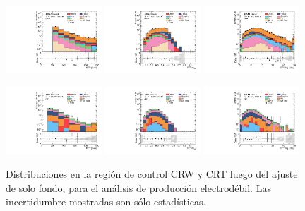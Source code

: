 \begin{figure}

\centering

    \includegraphics[width=0.32\textwidth]{images/analysis_EWK/v192_1_nosyst/can_CRW_met_et_afterFit.pdf}
    \includegraphics[width=0.32\textwidth]{images/analysis_EWK/v192_1_nosyst/can_CRW_met_etmeff_afterFit.pdf}
    \includegraphics[width=0.32\textwidth]{images/analysis_EWK/v192_1_nosyst/can_CRW_met_sig_obj_afterFit.pdf}

    \includegraphics[width=0.32\textwidth]{images/analysis_EWK/v192_1_nosyst/can_CRT_met_et_afterFit.pdf}
    \includegraphics[width=0.32\textwidth]{images/analysis_EWK/v192_1_nosyst/can_CRT_met_etmeff_afterFit.pdf}
    \includegraphics[width=0.32\textwidth]{images/analysis_EWK/v192_1_nosyst/can_CRT_met_sig_obj_afterFit.pdf}

    \caption{Distribuciones en la región de control CRW y CRT luego del ajuste de solo fondo, para el análisis de producción electrodébil. Las incertidumbre mostradas son sólo estadísticas.}
    \label{fig:crw_crt_dist_ewk}

\end{figure}


